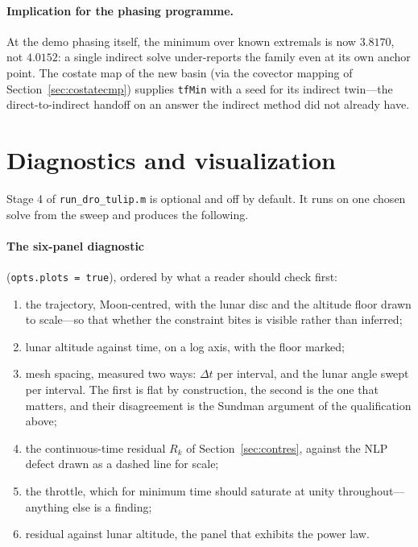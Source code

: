 \documentclass[11pt]{article}
\newcommand{\code}[1]{\texttt{#1}}
\begin{document}
\paragraph{Implication for the phasing programme.} At the demo phasing itself,
the minimum over known extremals is now $3.8170$, not $4.0152$: a single
indirect solve under-reports the family even at its own anchor point. The
costate map of the new basin (via the covector mapping of
Section~\ref{sec:costatecmp}) supplies \code{tfMin} with a seed for its
indirect twin---the direct-to-indirect handoff on an answer the indirect
method did not already have.

\section{Diagnostics and visualization}

Stage 4 of \code{run\_dro\_tulip.m} is optional and off by default. It runs on
one chosen solve from the sweep and produces the following.

\paragraph{The six-panel diagnostic} (\code{opts.plots = true}), ordered by what
a reader should check first:
\begin{enumerate}
  \item[(a)] the trajectory, Moon-centred, with the lunar disc and the altitude
        floor drawn to scale---so that whether the constraint bites is visible
        rather than inferred;
  \item[(b)] lunar altitude against time, on a log axis, with the floor marked;
  \item[(c)] mesh spacing, measured two ways: $\Delta t$ per interval, and the
        lunar angle swept per interval. The first is flat by construction, the
        second is the one that matters, and their disagreement is the
        Sundman argument of the qualification above;
  \item[(d)] the continuous-time residual $R_k$ of Section~\ref{sec:contres},
        against the NLP defect drawn as a dashed line for scale;
  \item[(e)] the throttle, which for minimum time should saturate at unity
        throughout---anything else is a finding;
  \item[(f)] residual against lunar altitude, the panel that exhibits the
        power law.
\end{enumerate}
\end{document}
